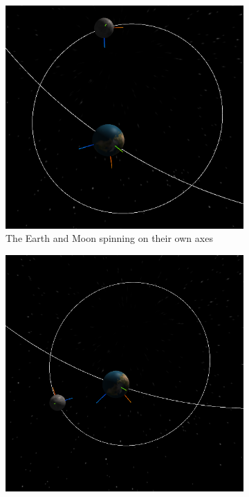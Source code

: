 \documentclass[12pt]{article}
\begin{document}
\begin{figure}[H]
\begin{subfigure}[b]{0.4\textwidth}
                \includegraphics[width=\textwidth]{images/earthandmoonaxisspinabove2}
                \caption{The Earth and Moon spinning on their own axes}
                \label{fig: The axial spin of the Earth and moon.}
       \end{subfigure}
               \begin{subfigure}[b]{0.4\textwidth}
                \includegraphics[width=\textwidth]{images/earthandmoonaxisspinabove3}

\end{subfigure}
\end{figure}
\end{document}
